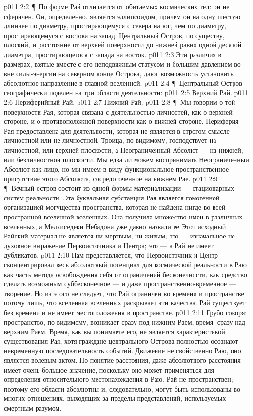 \vs p011 2:2 \P\ По форме Рай отличается от обитаемых космических тел: он не сферичен. Он, определенно, является эллипсоидом, причем он на одну шестую длиннее по диаметру, простирающемуся с севера на юг, чем по диаметру, простирающемуся с востока на запад. Центральный Остров, по существу, плоский, и расстояние от верхней поверхности до нижней равно одной десятой диаметра, простирающегося с запада на восток.
\vs p011 2:3 Эти различия в размерах, взятые вместе с его неподвижным статусом и большим давлением во вне силы\hyp{}энергии на северном конце Острова, дают возможность установить абсолютное направление в главной вселенной.
\vs p011 2:4 \P\ Центральный Остров географически поделен на три области деятельности:
\vs p011 2:5 \bibnobreakspace Верхний Рай.
\vs p011 2:6 \bibnobreakspace Периферийный Рай.
\vs p011 2:7 \bibnobreakspace Нижний Рай.
\vs p011 2:8 \P\ Мы говорим о той поверхности Рая, которая связана с деятельностью личностей, как о верхней стороне, и о противоположной поверхности как о нижней стороне. Периферия Рая предоставлена для деятельности, которая не является в строгом смысле личностной или не\hyp{}личностной. Троица, по\hyp{}видимому, господствует на личностной, или верхней плоскости, а Неограниченный Абсолют --- на нижней, или безличностной плоскости. Мы едва ли можем воспринимать Неограниченный Абсолют как лицо, но мы имеем в виду функциональное пространственное присутствие этого Абсолюта, сосредоточенное на нижнем Рае.
\vs p011 2:9 \P\ Вечный остров состоит из одной формы материализации --- стационарных систем реальности. Эта буквальная субстанция Рая является гомогенной организацией могущества пространства, которая не найдена нигде во всей пространной вселенной вселенных. Она получила множество имен в различных вселенных, а Мелхиседеки Небадона уже давно назвали ее  Этот исходный Райский материал не является ни мертвым, ни живым; это --- изначальное не\hyp{}духовное выражение Первоисточника и Центра; это ---  а Рай не имеет дубликатов.
\vs p011 2:10 Нам представляется, что Первоисточник и Центр сконцентрировал весь абсолютный потенциал для космической реальности в Раю как часть метода освобождения себя от ограничений бесконечности, как средство сделать возможным суббесконечное --- и даже пространственно\hyp{}временное --- творение. Но из этого не следует, что Рай ограничен во времени и пространстве потому лишь, что вселенная вселенных раскрывает эти качества. Рай существует без времени и не имеет местоположения в пространстве.
\vs p011 2:11 Грубо говоря: пространство, по\hyp{}видимому, возникает сразу под нижним Раем, время, сразу над верхним Раем. Время, как вы понимаете его, не является характеристикой существования Рая, хотя граждане центрального Острова полностью осознают невременную последовательность событий. Движение не свойственно Раю, оно является волевым актом. Но понятие расстояния, даже абсолютного расстояния имеет очень большое значение, поскольку оно может применяться для определения относительного местонахождения в Раю. Рай не\hyp{}пространствен; поэтому его области абсолютны и, следовательно, могут быть использованы во многих отношениях, выходящих за пределы представлений, используемых смертным разумом.
